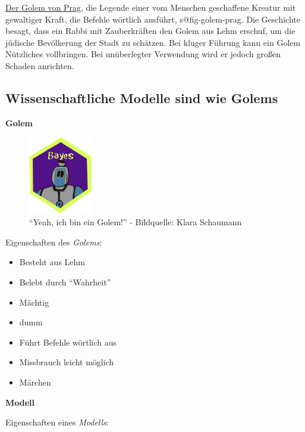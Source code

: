 \documentclass[
  a4paper,
  DIV=11]{scrreprt}
\providecommand{\tightlist}{%
  \setlength{\itemsep}{0pt}\setlength{\parskip}{0pt}}\usepackage{longtable,booktabs,array}
\theoremstyle{definition}
\theoremstyle{remark}
\begin{document}
\href{http://www.prague.net/golem}{Der Golem von Prag}, die Legende
einer vom Menschen geschaffene Kreatur mit gewaltiger Kraft, die Befehle
wörtlich ausführt, s@fig-golem-prag. Die Geschichte besagt, dass ein
Rabbi mit Zauberkräften den Golem aus Lehm erschuf, um die jüdische
Bevölkerung der Stadt zu schätzen. Bei kluger Führung kann ein Golem
Nützliches vollbringen. Bei unüberlegter Verwendung wird er jedoch
großen Schaden anrichten.

\hypertarget{wissenschaftliche-modelle-sind-wie-golems}{%
\subsection{Wissenschaftliche Modelle sind wie
Golems}\label{wissenschaftliche-modelle-sind-wie-golems}}

\textbf{Golem}

\begin{figure}

{\centering \includegraphics[width=0.25\textwidth,height=\textheight]{./img/Golem_hex.png}

}

\caption{``Yeah, ich bin ein Golem!'' - Bildquelle: Klara Schaumann}

\end{figure}

Eigenschaften des \emph{Golems}:

\begin{itemize}
\tightlist
\item
  Besteht aus Lehm
\item
  Belebt durch ``Wahrheit''
\item
  Mächtig
\item
  dumm
\item
  Führt Befehle wörtlich aus
\item
  Missbrauch leicht möglich
\item
  Märchen
\end{itemize}

\textbf{Modell}

Eigenschaften eines \emph{Modells}:
\end{document}
